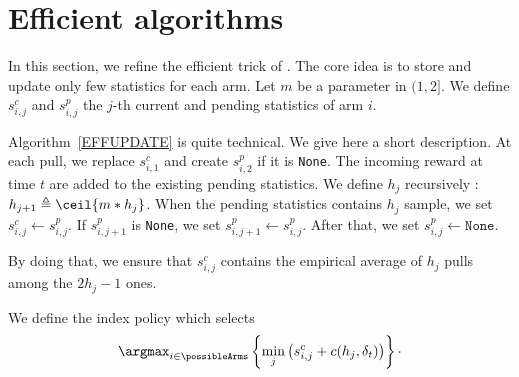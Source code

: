 \section{Efficient algorithms}
\label{app:efficient_alg}

In this section, we refine the efficient trick of \cite{seznec2019rotting}. The core idea is to store and update only few statistics for each arm.
Let $m$ be a parameter in $(1,2]$. We define $s_{i,j}^{c}$ and $s_{i,j}^p$ the $j$-th current and pending statistics of arm $i$. 



Algorithm~\ref{EFFUPDATE} is quite technical. We give here a short description. At each pull, we replace $s_{i,1}^{c}$ and create $s_{i,2}^{p}$ if it is \texttt{None}.
The incoming reward at time $t$ are added to the existing pending statistics. We define $h_j$ recursively : $h_{j+1} \triangleq \ceil{m*h_{j}}$. When the pending statistics contains $h_j$ sample, we set $s_{i,j}^{c} \leftarrow s_{i,j}^{p}$. If $s_{i,j+1}^{p}$ is \texttt{None}, we set $s_{i,j+1}^{p} \leftarrow s_{i,j}^{p}$. After that, we set $s_{i,j}^{p} \leftarrow \texttt{None}$.

By doing that, we ensure that $s_{i,j}^{c}$ contains the empirical average of $h_j$ pulls among the $2h_j-1$ ones. 

We define \EFFU the index policy which selects
\[\argmax_{i \in \possibleArms} \left\{\min_{j}\left(s^c_{i,j} + c(h_j, \delta_t)\right)\right\}\cdot
\]


